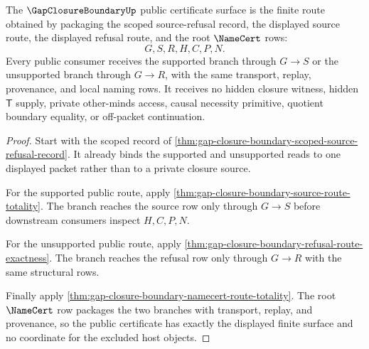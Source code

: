 \begin{theorem}
\label{thm:gapclosureboundary-public-certificate}
The $\GapClosureBoundaryUp$ public certificate surface is the finite route obtained by packaging the scoped source-refusal record, the displayed source route, the displayed refusal route, and the root $\NameCert$ rows:
$$
G,S,R,H,C,P,N .
$$
Every public consumer receives the supported branch through $G \longrightarrow S$ or the unsupported branch through $G \longrightarrow R$, with the same transport, replay, provenance, and local naming rows. It receives no hidden closure witness, hidden $\mathsf{T}$ supply, private other-minds access, causal necessity primitive, quotient boundary equality, or off-packet continuation.
\end{theorem}
\begin{proof}
Start with the scoped record of \autoref{thm:gap-closure-boundary-scoped-source-refusal-record}. It already binds the supported and unsupported reads to one displayed packet rather than to a private closure source.

For the supported public route, apply \autoref{thm:gap-closure-boundary-source-route-totality}. The branch reaches the source row only through $G \longrightarrow S$ before downstream consumers inspect $H,C,P,N$.

For the unsupported public route, apply \autoref{thm:gap-closure-boundary-refusal-route-exactness}. The branch reaches the refusal row only through $G \longrightarrow R$ with the same structural rows.

Finally apply \autoref{thm:gap-closure-boundary-namecert-route-totality}. The root $\NameCert$ row packages the two branches with transport, replay, and provenance, so the public certificate has exactly the displayed finite surface and no coordinate for the excluded host objects.
\end{proof}

